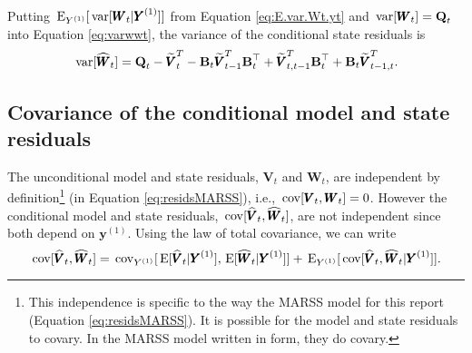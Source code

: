 \documentclass[]{article}
\def\UPS{\mbox{\boldmath $\Upsilon$}}
\def\BB{\mbox{$\mathbf B$}}	\def\bb{\mbox{$\mathbf b$}} \def\Bb{\mbox{$\mathbf J$}} \def\Ba{\mbox{$\mathbf L$}} \def\Bm{\UPS}
\def\E{\,\textup{\textrm{E}}}
\def\QQ{\mbox{$\mathbf Q$}}	 \def\qq{\mbox{$\mathbf q$}} \def\Qb{\mbox{$\mathbf G$}}  \def\Qm{\mathbb{Q}}
\def\VV{\mbox{$\pmb{V}$}}	\def\vv{\mbox{$\pmb{v}$}}
\def\WW{\mbox{$\pmb{W}$}}	\def\ww{\mbox{$\pmb{w}$}}
\def\YY{\mbox{$\pmb{Y}$}}	\def\yy{\mbox{$\pmb{y}$}}
\def\var{\,\textup{\textrm{var}}}
\def\cov{\,\textup{\textrm{cov}}}
\def\hatWt{\widehat{\WW}_t}
\def\hatVt{\widehat{\VV}_t}
\def\hatVtT{\widetilde{\VV}_t^T}
\def\hatVtmT{\widetilde{\VV}_{t-1}^T}
\def\hatVttmT{\widetilde{\VV}_{t,t-1}^T}
\def\hatVtmtT{\widetilde{\VV}_{t-1,t}^T}
\begin{document}
Putting $\E_{Y^{(1)}}[\var[\WW_t|\YY^{(1)}]]$ from Equation \ref{eq:E.var.Wt.yt} and $\var[\WW_t]=\QQ_t$ into Equation \ref{eq:varwwt}, the variance of the conditional state residuals is
\begin{equation}
\var[\hatWt] = \QQ_t - \hatVtT - \BB_t\hatVtmT\BB_t^\top + \hatVttmT\BB_t^\top + \BB_t\hatVtmtT .
\end{equation}

\subsection{Covariance of the conditional model and state residuals}

The unconditional model and state residuals, $\VV_t$ and $\WW_t$, are independent by definition\footnote{This independence is specific to the way the MARSS model for this report (Equation \ref{eq:residsMARSS}). It is possible for the model and state residuals to covary. In the MARSS model written in \citet{Harveyetal1998} form, they do covary.} (in Equation \ref{eq:residsMARSS}), i.e., $\cov[\VV_t,\WW_t]=0$.  However the conditional model and state residuals, $\cov[\hatVt,\hatWt]$, are not independent since both depend on $\yy^{(1)}$.  
Using the law of total covariance, we can write
\begin{equation}\label{eq:covhatVtWt1}
\cov[\hatVt,\hatWt] = 
\cov_{Y^{(1)}}[\E[\hatVt|\YY^{(1)}],\E[\hatWt|\YY^{(1)}]] + \E_{Y^{(1)}}[\cov[\hatVt, \hatWt|\YY^{(1)}]] .
\end{equation}
\end{document}
